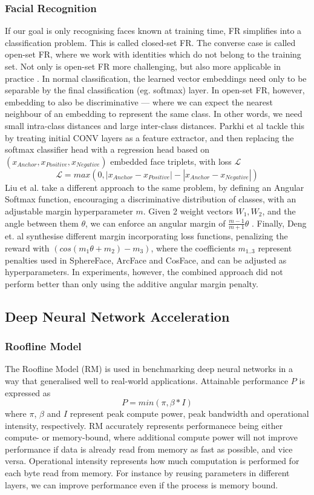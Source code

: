 \documentclass[12pt]{article}
\newcommand{\Loss}{\mathcal{L}}
\begin{document}
\subsubsection{Facial Recognition}
If our goal is only recognising faces known at training time, FR simplifies
into a classification problem. This is called closed-set FR.
The converse case is called open-set FR, where we work with identities which do not belong to
the training set.
Not only is open-set FR more challenging, but also more applicable in practice
\cite{liu2017sphereface}.
In normal classification, the learned vector embeddings need only to be separable by the final
classification (eg. softmax) layer.
In open-set FR, however, embedding to also be discriminative --- where we can expect the nearest
neighbour of an embedding to represent the same class. In other words, we need small intra-class
distances and large inter-class distances\cite{deng2019arcface}.
Parkhi et al\cite{parkhi2015deep} tackle this by treating initial CONV layers as a feature
extractor, and then replacing the softmax classifier head with a regression head based on
$(x_{Anchor}, x_{Positive}, x_{Negative})$ embedded face triplets, with loss $\Loss$ $$\Loss =
max(0, |x_{Anchor} - x_{Positive}| - |x_{Anchor} - x_{Negative}|)$$
Liu et al. \cite{liu2017sphereface} take a different approach to the same problem,
by defining an Angular Softmax function, encouraging a discriminative distribution of classes,
with an adjustable margin hyperparameter $m$.
Given 2 weight vectors $W_1, W_2$, and the angle between them $\theta$, we can enforce an
angular margin of $\frac{m-1}{m+1}\theta$ \cite{li2018angular}.
Finally, Deng et. al synthesise different margin incorporating loss functions, 
penalizing the reward with $(cos(m_1\theta + m_2) - m_3)$, where the coefficients $m_{1..3}$
represent penalties used in SphereFace, ArcFace and CosFace, and can be adjusted as hyperparameters.
In experiments, however, the combined approach did not perform better
than only using the additive angular margin penalty\cite{deng2019arcface}.


\subsection{Deep Neural Network Acceleration}
\subsubsection{Roofline Model}
The Roofline Model (RM) is used in benchmarking deep neural networks in a way that generalised well
to real-world applications\cite{umuroglu2016finn}.
Attainable performance $P$ is expressed as $$P = min(\pi, \beta * I)$$ where $\pi$, $\beta$
and $I$ represent peak compute power, peak bandwidth and operational intensity, respectively.
RM accurately represents performanece being either compute- or memory-bound, where additional
compute power will not improve performance if data is already read from memory as fast as
possible, and vice versa.
Operational intensity represents how much computation is performed for each byte read from memory.
For instance by reusing parameters in different layers, we can improve performance even if the
process is memory bound.
\end{document}
